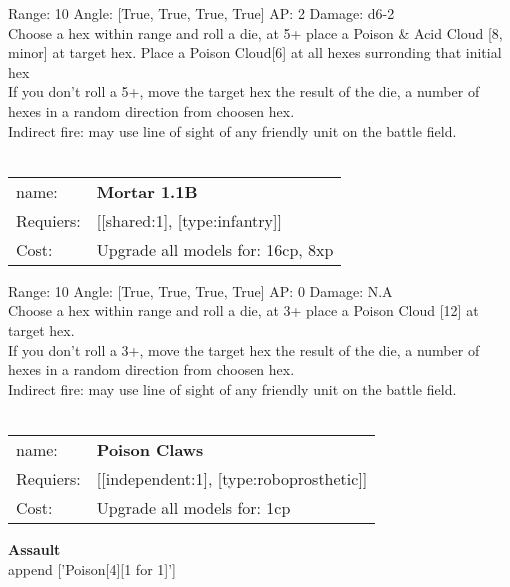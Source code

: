Range: 10  Angle: [True, True, True, True] AP: 2 Damage: d6-2 \\
Choose a hex within range and roll a die, at 5+ place a Poison \& Acid Cloud [8, minor] at target hex. Place a Poison Cloud[6]  at all hexes surronding that initial hex\\ 
If you don't roll a 5+, move the target hex the result of the die, a number of hexes in a random direction from choosen hex.\\ 
Indirect fire: may use line of sight of any friendly unit on the battle field.\\ 








\ \\
\begin{tabular}{ll}
name: & {\bf Mortar 1.1B } \\
Requiers: & [[shared:1], [type:infantry]] \\
Cost: & Upgrade all models for: 16cp, 8xp \\
\end{tabular}



Range: 10  Angle: [True, True, True, True] AP: 0 Damage: N.A \\
Choose a hex within range and roll a die, at 3+ place a Poison Cloud [12] at target hex.\\ 
If you don't roll a 3+, move the target hex the result of the die, a number of hexes in a random direction from choosen hex.\\ 
Indirect fire: may use line of sight of any friendly unit on the battle field.\\ 








\ \\
\begin{tabular}{ll}
name: & {\bf Poison Claws } \\
Requiers: & [[independent:1], [type:roboprosthetic]] \\
Cost: & Upgrade all models for: 1cp \\
\end{tabular}





{\bf Assault} \ \\

append ['Poison[4][1 for 1]']


